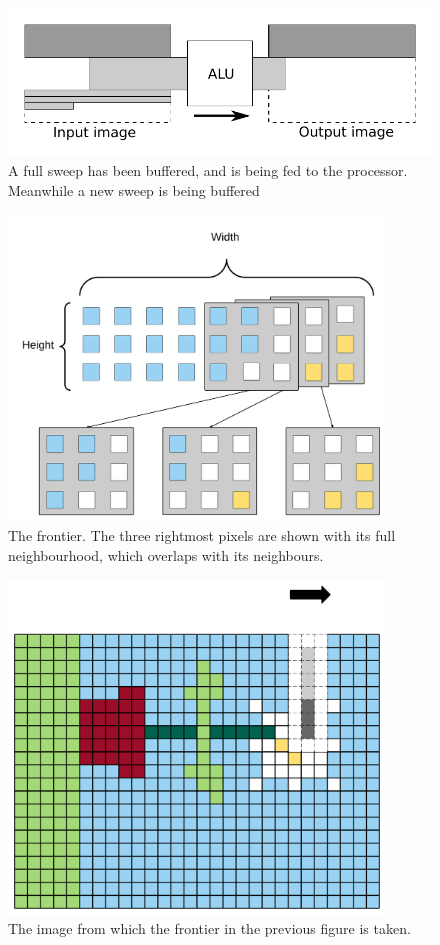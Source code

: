 \begin{figure}[h!]
    \includegraphics[width=\linewidth]{img/daisy_processing.pdf}
    \caption[Buffering and feeding of sweeps.]{A full sweep has been buffered, and is being fed to the processor. Meanwhile a new sweep is being buffered}
    \label{fig:sweep_feed}
\end{figure}

\begin{figure}[h!]
    \centering
    \includegraphics[width=10cm]{img/frontier1.png}
    \caption[The frontier.]{The frontier. The three rightmost pixels are shown with its full neighbourhood, which overlaps with its neighbours.}
    \label{fig:frontier1}
\end{figure}

\begin{figure}[h!]
    \centering
    \includegraphics[width=10cm]{img/frontier2.png}
    \caption{The image from which the frontier in the previous figure is taken.}
    \label{fig:frontier2}
\end{figure}

